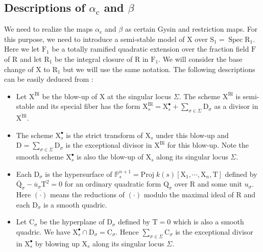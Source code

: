 \documentclass[10pt]{amsart}
\numberwithin{equation}{section}
\theoremstyle{definition}
\DeclareMathOperator{\Spec}{Spec}
\def\PP{\mathbb{P}}
\def\rmc{\mathrm{c}}
\def\rmC{\mathrm{C}}
\def\rmD{\mathrm{D}}
\def\rmF{\mathrm{F}}
\def\rmQ{\mathrm{Q}}
\def\rmR{\mathrm{R}}
\def\rmS{\mathrm{S}}
\def\rmX{\mathrm{X}}
\def\rmT{\mathrm{T}}
\begin{document}
\subsection{Descriptions of $\alpha_{\rmc}$ and $\beta$}\label{semi} We need to realize the maps $\alpha_{\rmc}$ and $\beta$ as certain Gysin and restriction maps. For this purpose, we need to introduce a semi-stable model of $\rmX$ over ${\rmS}_{1}=\Spec{\rmR_{1}}$. Here we let ${\rmF}_{1}$ be a totally ramified quadratic extension over the fraction field $\rmF$ of $\rmR$ and let ${\rmR}_{1}$ be the integral closure of $\rmR$ in ${\rmF}_{1}$. We will consider the base change of $\rmX$ to ${\rmR}_{1}$ but we will use the same notation. The following descriptions can be easily deduced from \cite[Proposition 2.4]{Illusie-van}:
\begin{itemize}
\item Let $\rmX^{\mathrm{Bl}}$ be the blow-up of  $\rmX$ at the singular locus $\Sigma$. The scheme  $\rmX^{\mathrm{Bl}}$ is semi-stable and its special fiber has the form  $\rmX^{\mathrm{Bl}}_{s}={\rmX}^{\bullet}_{s}+ \sum\limits_{\sigma\in\Sigma}\rmD_{\sigma}$ as a divisor in $\rmX^{\mathrm{Bl}}$. 
\item The scheme ${\rmX}^{\bullet}_{s}$ is the strict transform of $\rmX_{s}$ under this blow-up and $\rmD=\sum\limits_{\sigma\in\Sigma}\rmD_{\sigma}$ is the exceptional divisor in $\rmX^{\mathrm{Bl}}$ for this blow-up. Note the smooth scheme ${\rmX}^{\bullet}_{s}$ is also the blow-up of $\rmX_{s}$ along its singular locus $\Sigma$.
\item Each $\rmD_{\sigma}$ is the hypersurface of $\PP^{n+1}_{s}=\mathrm{Proj}\phantom{.}k(s)[\rmX_{1},\cdots, \rmX_{n}, \rmT]$ defined by $\overline{\rmQ}_{\sigma}-\overline{u}_{\sigma}\rmT^{2}=0$ for an ordinary quadratic form $\rmQ_{\sigma}$ over $\rmR$ and some unit ${u}_{\sigma}$. Here $\overline{(\cdot)}$ means the reductions of $(\cdot)$ modulo the maximal ideal of $\rmR$ and each $\rmD_{\sigma}$ is a smooth quadric.
\item Let $\rmC_{\sigma}$ be the hyperplane of $\rmD_{\sigma}$ defined by $\rmT=0$ which is also a  smooth quadric. We have ${\rmX}^{\bullet}_{s}\cap \rmD_{\sigma}=\rmC_{\sigma}$. Hence $\sum\limits_{\sigma\in\Sigma}\rmC_{\sigma}$ is the exceptional divisor in ${\rmX}^{\bullet}_{s}$ by blowing up $\rmX_{s}$ along its singular locus $\Sigma$.
\end{itemize} 
\end{document}

